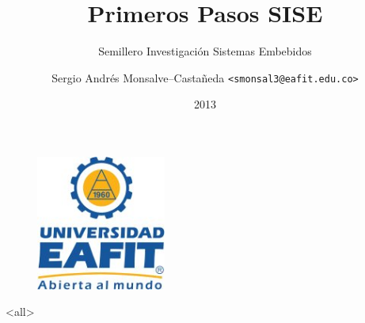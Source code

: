 \documentclass[ignorenonframetext]{beamer}
\title[2da Sesión 2014-1 SISE]{Primeros Pasos SISE}
\subtitle{Semillero Investigación Sistemas Embebidos}
\author[]{Sergio Andrés Monsalve--Castañeda \texttt{<smonsal3@eafit.edu.co>}}
\institute[Universidad EAFIT]{Universidad EAFIT}
\date[Universidad EAFIT]{2013}
\begin{document}
\begin{frame}
 \begin{figure}[htp]
	\centering
	\includegraphics[width=0.38\textwidth]{imgs/logo_EAFIT}
\end{figure}
\end{frame}

\begin{frame}
  \titlepage
\end{frame}

\mode<all>



\mode*

 
\end{document}
